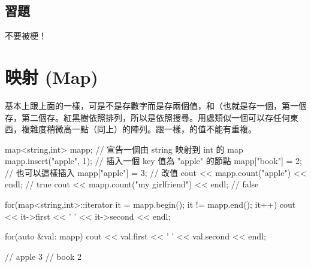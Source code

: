 \subsection{習題}
不要被梗！
\section{映射 (Map)}
基本上跟上面的一樣，可是不是存數字而是存兩個值，和（也就是存一個，第一個存，第二個存。紅黑樹依照排列，所以是依照搜尋。用處類似一個可以存任何東西，複雜度稍微高一點（同上）的陣列。跟一樣，的值不能有重複。
\begin{C++}
map<string,int> mapp;
// 宣告一個由 string 映射到 int 的 map
mapp.insert({"apple", 1});
// 插入一個 key 值為 "apple" 的節點
mapp["book"] = 2; // 也可以這樣插入
mapp["apple"] = 3; // 改值
cout << mapp.count("apple") << endl; // true
cout << mapp.count("my girlfriend") << endl; // false

for(map<string,int>::iterator it = mapp.begin(); it != mapp.end(); it++)
    cout << it->first << ' ' << it->second << endl;

for(auto &val: mapp)
    cout << val.first << ' ' << val.second << endl;

// apple 3
// book 2
\end{C++}


